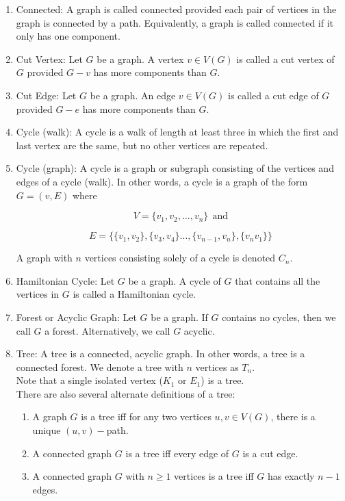 \documentclass{article}
\begin{document}
\begin{enumerate}
    \item Connected: A graph is called connected provided each pair of vertices in the graph is connected by a path.
    Equivalently, a graph is called connected if it only has one component.
    
    \item Cut Vertex: Let $G$ be a graph.
    A vertex $v\in V(G)$ is called a cut vertex of $G$ provided $G-v$ has more components than $G$.
    
    \item Cut Edge: Let $G$ be a graph.
    An edge $v\in V(G)$ is called a cut edge of $G$ provided $G-e$ has more components than $G$.
    
    \item Cycle (walk): A cycle is a walk of length at least three in which the first and last vertex are the same, but no other vertices are repeated.
    
    \item Cycle (graph): A cycle is a graph or subgraph consisting of the vertices and edges of a cycle (walk).
    In other words, a cycle is a graph of the form $G=(v,E)$ where
    
    \[V=\{v_1,v_2,\dots,v_n\} \:\: \text{and}\]
    
    \[E=\{\{v_1,v_2\}, \{v_3,v_4\}\dots,\{v_{n-1},v_n\},\{v_nv_1\}\}\]
    
    A graph with $n$ vertices consisting solely of a cycle is denoted $C_n$.
    
    \item Hamiltonian Cycle: Let $G$ be a graph.
    A cycle of $G$ that contains all the vertices in $G$ is called a Hamiltonian cycle.
    
    \item Forest or Acyclic Graph: Let $G$ be a graph.
    If $G$ contains no cycles, then we call $G$ a forest.
    Alternatively, we call $G$ acyclic.
    
    \item Tree: A tree is a connected, acyclic graph.
    In other words, a tree is a connected forest.
    We denote a tree with $n$ vertices as $T_n$.\\
    
    Note that a single isolated vertex ($K_1$ or $E_1$) is a tree.\\
    
    There are also several alternate definitions of a tree:
    
        \begin{enumerate}
            \item A graph $G$ is a tree iff for any two vertices $u,v\in V(G)$, there is a unique $(u,v)-$path. 
            \item A connected graph $G$ is a tree iff every edge of $G$ is a cut edge.
            \item A connected graph $G$ with $n\geq 1$ vertices is a tree iff $G$ has exactly $n-1$ edges.
        \end{enumerate}
        

\end{enumerate}
\end{document}
